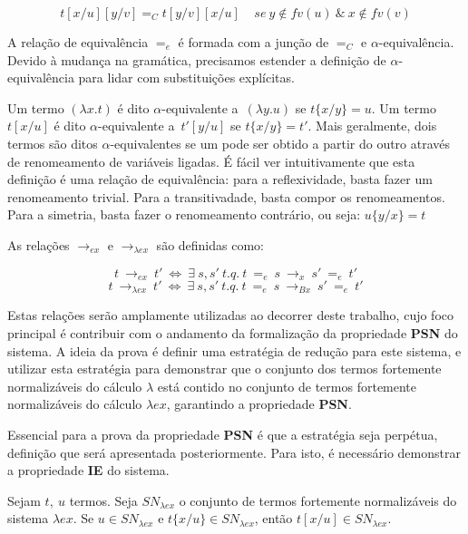 \[ t[x/u][y/v] =_C t[y/v][x/u] \ \ \ \ \ se\ y \notin fv(u)\ \&\ x \notin fv(v)\] 

A relação de equivalência $=_e$ é formada com a junção de $=_C$ e
$\alpha$-equivalência. Devido à mudança na gramática, precisamos estender a
definição de $\alpha$-equivalência para lidar com substituições explícitas.


\begin{definicao}
    Um termo $(\lambda x. t)$ é dito $\alpha$-equivalente a\ $(\lambda y. u)$ se
    $ t\{x/y\} = u $.  Um termo $t[x/u]$ é dito $\alpha$-equivalente a\
    $t'[y/u]$ se $ t\{x/y\} = t' $. Mais geralmente, dois termos são ditos
    $\alpha$-equivalentes se um pode ser obtido a partir do outro através de
    renomeamento de variáveis ligadas.
    É fácil ver intuitivamente que esta definição é uma relação de equivalência:
    para a reflexividade, basta fazer um renomeamento trivial. Para a
    transitivadade, basta compor os renomeamentos.  Para a simetria, basta fazer
    o renomeamento contrário, ou seja: $ u\{y/x\} = t $

\end{definicao}



As relações $\rightarrow_{ex}$ e $\rightarrow_{\lambda
    ex}$ são definidas como:

\[t\ \rightarrow_{ex}\ t'\ \iff\ \exists\ s,s'\ t.q.\ t\ =_{e}\ s\
    \rightarrow_x\ s'\ =_e\ t' \]
\[t\ \rightarrow_{\lambda ex}\ t'\ \iff\ \exists\ s,s'\ t.q.\ t\ =_{e}\ s\
    \rightarrow_{Bx}\ s'\ =_e\ t' \]

Estas relações serão amplamente utilizadas ao decorrer deste trabalho, cujo foco
principal é contribuir com o andamento da formalização da propriedade
\textbf{PSN} do sistema.  A ideia da prova é definir uma estratégia de redução
para este sistema, e utilizar esta estratégia para demonstrar que o conjunto dos
termos fortemente normalizáveis do cálculo $\lambda$ está contido no conjunto de
termos fortemente normalizáveis do cálculo $\lambda ex$, garantindo a
propriedade \textbf{PSN}.

Essencial para a prova da propriedade \textbf{PSN} é que a estratégia seja
perpétua, definição que será apresentada posteriormente. Para isto, é necessário
demonstrar a propriedade \textbf{IE} do sistema.

\begin{definicao}[Propriedade IE]
    Sejam $t,\ u$ termos. Seja $SN_{\lambda ex}$ o conjunto de termos fortemente
    normalizáveis do sistema $\lambda ex$. Se $u \in SN_{\lambda ex}$ e
    $t\{x/u\} \in SN_{\lambda ex}$, então $t[x/u] \in SN_{\lambda ex}$.
\end{definicao}

